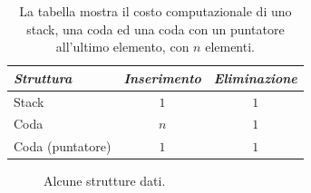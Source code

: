 \begin{table}
	\centering
	\caption[Costo computazionale]{La tabella mostra il costo computazionale di uno stack, una coda ed una coda con un puntatore all'ultimo elemento, con $n$ elementi.}
	\label{tab:co-st}
	\begin{tabular}{l | c c}
		\toprule
\emph{Struttura}		&\emph{Inserimento}	&\emph{Eliminazione}	\\
		\midrule
	Stack			&$1$				&$1$				\\
	Coda			&$n$				&$1$				\\
	Coda (puntatore)	&$1$				&$1$
	\end{tabular}
\end{table}

\begin{figure}
	\centering
\quad
	\caption{Alcune strutture dati.}
\end{figure}